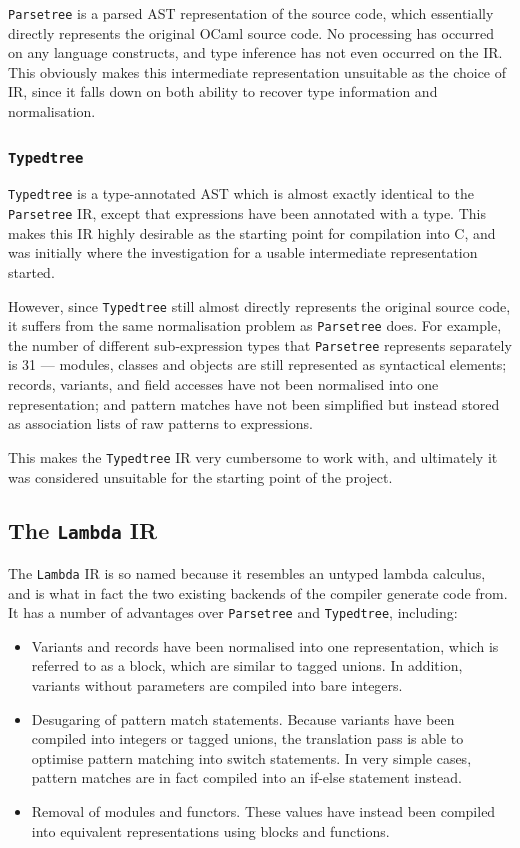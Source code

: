 \documentclass[12pt,a4paper,twoside,openright]{report}
\begin{document}
\texttt{Parsetree} is a parsed AST representation of the source code, which 
essentially directly represents the original OCaml source code. No processing 
has occurred on any language constructs, and type inference has not even 
occurred on the IR. This obviously makes this intermediate representation 
unsuitable as the choice of IR, since it falls down on both ability to recover 
type information and normalisation.

\subsubsection{\texttt{Typedtree}}

\texttt{Typedtree} is a type-annotated AST which is almost exactly identical to 
the \texttt{Parsetree} IR, except that expressions have been annotated with a 
type. This makes this IR highly desirable as the starting point for compilation 
into C, and was initially where the investigation for a usable intermediate 
representation started.

However, since \texttt{Typedtree} still almost directly represents the original 
source code, it suffers from the same normalisation problem as 
\texttt{Parsetree} does. For example, the number of different sub-expression 
types that \texttt{Parsetree} represents separately is 31 --- modules, classes 
and objects are still represented as syntactical elements; records, variants, 
and field accesses have not been normalised into one representation; and 
pattern matches have not been simplified but instead stored as association 
lists of raw patterns to expressions.

This makes the \texttt{Typedtree} IR very cumbersome to work with, and 
ultimately it was considered unsuitable for the starting point of the project.

\subsection{The \texttt{Lambda} IR}

The \texttt{Lambda} IR is so named because it resembles an untyped lambda 
calculus, and is what in fact the two existing backends of the compiler 
generate code from. It has a number of advantages over \texttt{Parsetree} and 
\texttt{Typedtree}, including:

\begin{itemize}
\item Variants and records have been normalised into one representation, which 
is referred to as a block, which are similar to tagged unions. In addition, 
variants without parameters are compiled into bare integers.
\item Desugaring of pattern match statements. Because variants have been 
compiled into integers or tagged unions, the translation pass is able to 
optimise pattern matching into switch statements. In very simple cases, pattern 
matches are in fact compiled into an if-else statement instead.
\item Removal of modules and functors. These values have instead been compiled 
into equivalent representations using blocks and functions.
\end{itemize}
\end{document}
